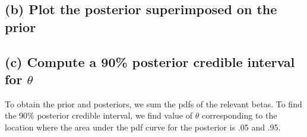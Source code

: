 \documentclass[11pt]{article}
\begin{document}
\subsection*{(b) Plot the posterior superimposed on the prior}
\subsection*{(c) Compute a 90\% posterior credible interval for $\theta$
}

To obtain the prior and posteriors, we sum the pdfs of the relevant betas. To find the 90\% posterior credible interval, we find value of $\theta$ corresponding to the location where the area under the pdf curve for the posterior is .05 and .95. 
\end{document}

